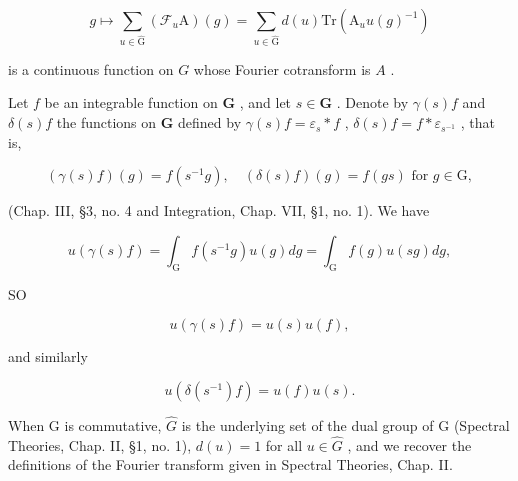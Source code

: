 \[
g \mapsto \sum_ {u \in \hat {\mathrm{G}}} (\mathcal {F} _ {u} \mathrm{A}) (g) = \sum_ {u \in \hat {\mathrm{G}}} d (u) \mathrm{Tr} (\mathrm{A} _ {u} u (g) ^ {- 1})
\]

is a continuous function on \(G\) whose Fourier cotransform is \(A\) .

Let \(f\) be an integrable function on \(\mathbf{G}\) , and let \(s \in \mathbf{G}\) . Denote by \(\gamma(s)f\) and \(\delta(s)f\) the functions on \(\mathbf{G}\) defined by \(\gamma(s)f = \varepsilon_s * f\) , \(\delta(s)f = f * \varepsilon_{s^{-1}}\) , that is,

\[
(\gamma (s) f) (g) = f (s ^ {- 1} g), \quad (\delta (s) f) (g) = f (g s) \text { for } g \in \mathrm{G},
\]

(Chap. III, §3, no. 4 and Integration, Chap. VII, §1, no. 1). We have

\[
u (\gamma (s) f) = \int_ {\mathrm{G}} f (s ^ {- 1} g) u (g) d g = \int_ {\mathrm{G}} f (g) u (s g) d g,
\]

SO

\[
u (\gamma (s) f) = u (s) u (f),\tag{12}
\]

and similarly

\[
u (\delta (s ^ {- 1}) f) = u (f) u (s).\tag{13}
\]

When G is commutative, \(\hat{G}\) is the underlying set of the dual group of G (Spectral Theories, Chap. II, §1, no. 1), \(d(u) = 1\) for all \(u \in \hat{G}\) , and we recover the definitions of the Fourier transform given in Spectral Theories, Chap. II.


